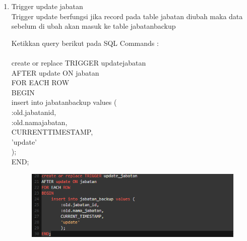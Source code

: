 \documentclass[12pt, times new roman, a4paper]{report}
\begin{document}
\begin{enumerate}
\item Trigger update jabatan\\
Trigger update berfungsi jika record pada table jabatan diubah maka data sebelum di ubah akan masuk ke table jabatan\textunderscore backup\\
\par Ketikkan query berikut pada SQL Commands :\\
\\
create or replace TRIGGER update\textunderscore jabatan\\
AFTER update ON jabatan\\
FOR EACH ROW\\
BEGIN\\
    insert into jabatan\textunderscore backup values (\\
        :old.jabatan\textunderscore id,\\
        :old.nama\textunderscore jabatan,\\
        CURRENT\textunderscore TIMESTAMP,\\
        'update'\\
        );\\
END;
\begin{figure}[h]
	\centering
		\includegraphics[scale=0.7]{gambar/18}
\end{figure}
\end{enumerate}
\end{document}
